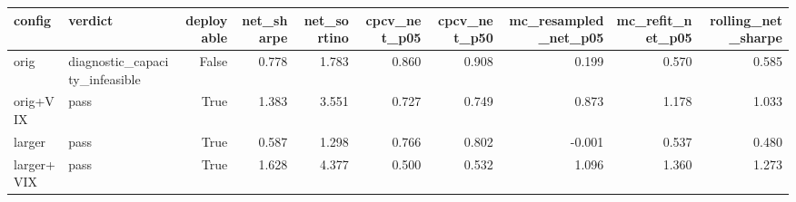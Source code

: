 \begin{tabular}{llrrrrrrrr}
\toprule
config & verdict & deployable & net\_sharpe & net\_sortino & cpcv\_net\_p05 & cpcv\_net\_p50 & mc\_resampled\_net\_p05 & mc\_refit\_net\_p05 & rolling\_net\_sharpe \\
\midrule
orig & diagnostic\_capacity\_infeasible & False & 0.778 & 1.783 & 0.860 & 0.908 & 0.199 & 0.570 & 0.585 \\
orig+VIX & pass & True & 1.383 & 3.551 & 0.727 & 0.749 & 0.873 & 1.178 & 1.033 \\
larger & pass & True & 0.587 & 1.298 & 0.766 & 0.802 & -0.001 & 0.537 & 0.480 \\
larger+VIX & pass & True & 1.628 & 4.377 & 0.500 & 0.532 & 1.096 & 1.360 & 1.273 \\
\bottomrule
\end{tabular}
